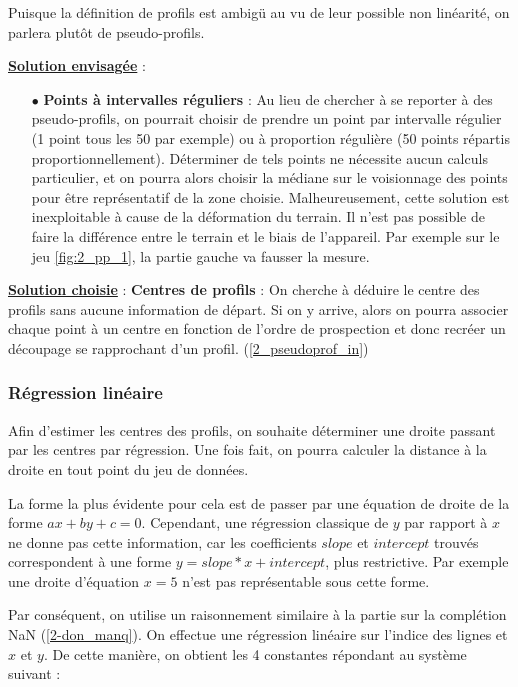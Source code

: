 \documentclass[12pt]{article}
\begin{document}
    Puisque la définition de profils est ambigü au vu de leur possible non linéarité, on parlera plutôt de pseudo-profils.

    \noindent\textbf{\underline{Solution envisagée}} :
    \begin{enumerate}
        \item[$\bullet$] \textbf{Points à intervalles réguliers} : Au lieu de chercher à se reporter à des pseudo-profils, on pourrait choisir de prendre un point par intervalle régulier (1 point tous les 50 par exemple) ou à proportion régulière (50 points répartis proportionnellement). Déterminer de tels points ne nécessite aucun calculs particulier, et on pourra alors choisir la médiane sur le voisionnage des points pour être représentatif de la zone choisie. Malheureusement, cette solution est inexploitable à cause de la déformation du terrain. Il n'est pas possible de faire la différence entre le terrain et le biais de l'appareil. Par exemple sur le jeu \ref{fig:2_pp_1}, la partie gauche va fausser la mesure.
    \end{enumerate}
    \textbf{\underline{Solution choisie}} : \textbf{Centres de profils} : \label{2_pseudoprof_out} On cherche à déduire le centre des profils sans aucune information de départ. Si on y arrive, alors on pourra associer chaque point à un centre en fonction de l'ordre de prospection et donc recréer un découpage se rapprochant d'un profil. (\ref{2_pseudoprof_in})

    \subsubsection{Régression linéaire}

    Afin d'estimer les centres des profils, on souhaite déterminer une droite passant par les centres par régression. Une fois fait, on pourra calculer la distance à la droite en tout point du jeu de données.

    La forme la plus évidente pour cela est de passer par une équation de droite de la forme $ax + by + c = 0$. Cependant, une régression classique de $y$ par rapport à $x$ ne donne pas cette information, car les coefficients $slope$ et $intercept$ trouvés correspondent à une forme $y = slope*x + intercept$, plus restrictive. Par exemple une droite d'équation $x = 5$ n'est pas représentable sous cette forme.

    Par conséquent, on utilise un raisonnement similaire à la partie sur la complétion NaN (\ref{2-don_manq}). On effectue une régression linéaire sur l'indice des lignes et $x$ et $y$. De cette manière, on obtient les 4 constantes répondant au système suivant :
\end{document}
